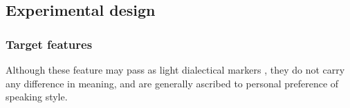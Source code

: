\subsection{Experimental design}
\label{subsec:design_HCIConv}

\subsubsection{Target features}
\label{subsubsec:target_features_HCIConv}




Although these feature may pass as light dialectical markers \citep{Mitterer2013regional}, they do not carry any difference in meaning, and are generally ascribed to personal preference of speaking style.

